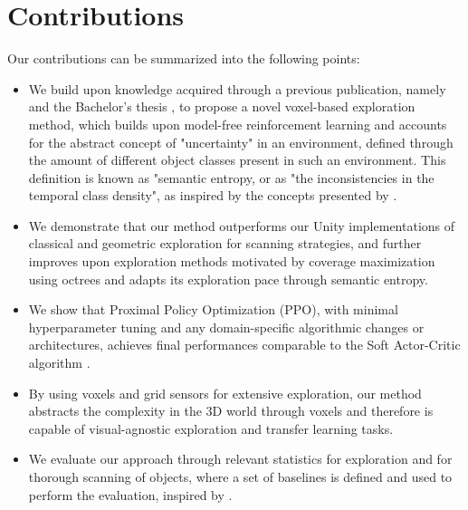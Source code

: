 \section{Contributions}\label{chap:1:contributions}
Our contributions can be summarized into the following points:
\begin{itemize}
    \item We build upon knowledge acquired through a previous publication, namely \textit{} \cite{DBLP:journals/corr/abs-2105-09843} and the Bachelor's thesis \textit{} \cite{dano2020}, to propose a novel voxel-based exploration method, which builds upon model-free
    reinforcement learning
    and accounts for the abstract concept of "uncertainty" in an environment, defined through the amount of different object classes present in such an environment. This definition is known as "semantic entropy, or as "the inconsistencies in the temporal class density", as inspired by the concepts presented by \textcite{chaplot2020semantic}.
    
    \item We demonstrate that our method outperforms our Unity implementations of classical and geometric exploration for scanning strategies, and further improves upon exploration methods motivated by coverage maximization \cite{chen2019learning} using octrees and adapts its exploration pace through semantic entropy.
    
    \item We show that Proximal Policy Optimization (PPO), with minimal hyperparameter tuning and any domain-specific algorithmic changes or architectures, achieves final performances comparable to the Soft Actor-Critic algorithm \cite{schulman2017proximal}.
    \item By using voxels and grid sensors for extensive exploration, our method abstracts the complexity in the 3D world through voxels and therefore is capable of visual-agnostic exploration and transfer learning tasks. 
    
    \item We evaluate our approach through relevant statistics for exploration and for thorough scanning of objects, where a set of baselines is defined and used to perform the evaluation, inspired by \textcite{darpa_subterranean_challenge}.
    

\end{itemize}
